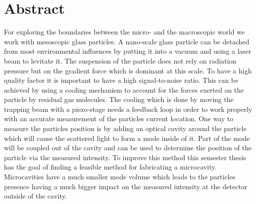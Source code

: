 \section*{Abstract}
For exploring the boundaries between the micro- and the macroscopic world we work with mesoscopic glass particles. A nano-scale glass particle can be detached from most environmental influences by putting it into a vacuum and using a laser beam to levitate it. The suspension of the particle does not rely on radiation pressure but on the gradient force which is dominant at this scale. To have a high quality factor it is important to have a high signal-to-noise ratio. This can be achieved by using a cooling mechanism to account for the forces exerted on the particle by residual gas molecules. The cooling which is done by moving the trapping beam with a piezo-stage needs a feedback loop in order to work properly with an accurate measurement of the particles current location. One way to measure the particles position is by adding an optical cavity around the particle which will cause the scattered light to form a mode inside of it. Part of the mode will be coupled out of the cavity and can be used to determine the position of the particle via the measured intensity. To improve this method this semester thesis has the goal of finding a feasible method for fabricating a microcavity. Microcavities have a much smaller mode volume which leads to the particles presence having a much bigger impact on the measured intensity at the detector outside of the cavity.

